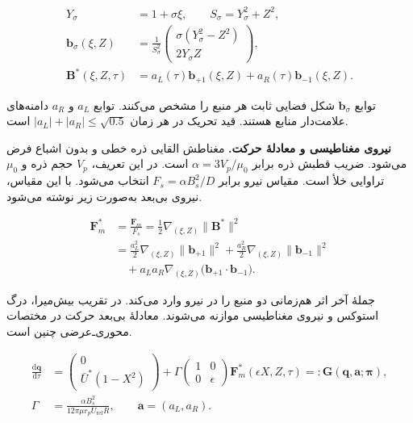 \begin{equation}
\begin{aligned}
Y_\sigma&=1+\sigma\xi,\qquad
S_\sigma=Y_\sigma^2+Z^2,\\
\mathbf b_\sigma(\xi,Z)&=
\frac{1}{S_\sigma^2}
\begin{pmatrix}
\sigma(Y_\sigma^2-Z^2)\\[2pt] 2Y_\sigma Z
\end{pmatrix},\\
\mathbf B^*(\xi,Z,\tau)&=
 a_L(\tau)\mathbf b_{+1}(\xi,Z)+a_R(\tau)\mathbf b_{-1}(\xi,Z).
\end{aligned}
\label{eq:forward-mag-field}
\end{equation}

توابع $\mathbf b_\sigma$ شکل فضایی ثابت هر منبع را مشخص می‌کنند.
توابع $a_L$ و $a_R$ دامنه‌های علامت‌دار منابع هستند.
قید تحریک در هر زمان $|a_L|+|a_R|\le\sqrt{0.5}$ است.

\textbf{نیروی مغناطیسی و معادلهٔ حرکت.}
مغناطش القایی ذره خطی و بدون اشباع فرض می‌شود.
ضریب قطبش ذره برابر $\alpha=3V_p/\mu_0$ است.
در این تعریف، $V_p$ حجم ذره و $\mu_0$ تراوایی خلأ است.
مقیاس نیرو برابر $F_s=\alpha B_s^2/D$ انتخاب می‌شود.
با این مقیاس، نیروی بی‌بعد به‌صورت زیر نوشته می‌شود.

\begin{equation}
\begin{aligned}
\mathbf F_m^*&=\frac{\mathbf F_m}{F_s}
=\frac12\nabla_{(\xi,Z)}\|\mathbf B^*\|^2\\
&=\frac{a_L^2}{2}\nabla_{(\xi,Z)}\|\mathbf b_{+1}\|^2
 +\frac{a_R^2}{2}\nabla_{(\xi,Z)}\|\mathbf b_{-1}\|^2\\
&\quad+a_La_R\nabla_{(\xi,Z)}
 \big(\mathbf b_{+1}\!\cdot\mathbf b_{-1}\big).
\end{aligned}
\label{eq:forward-mag-force}
\end{equation}

جملهٔ آخر اثر هم‌زمانی دو منبع را در نیرو وارد می‌کند.
در تقریب بیش‌میرا، درگ استوکس و نیروی مغناطیسی موازنه می‌شوند.
معادلهٔ بی‌بعد حرکت در مختصات محوری‌ـ‌عرضی چنین است.

\begin{equation}
\begin{aligned}
\frac{\mathrm d\mathbf q}{\mathrm d\tau}
&=\begin{pmatrix}0\\\bar U^*(1-X^2)\end{pmatrix}
+\Gamma
  \begin{pmatrix}1&0\\0&\epsilon\end{pmatrix}
  \mathbf F_m^*(\epsilon X,Z,\tau)
=:\mathbf G(\mathbf q,\mathbf a;\boldsymbol\pi),\\
\Gamma&=\frac{\alpha B_s^2}{12\pi\mu r_p U_{\mathrm{ref}}R},
\qquad \mathbf a=(a_L,a_R).
\end{aligned}
\label{eq:forward-mag-motion}
\end{equation}

